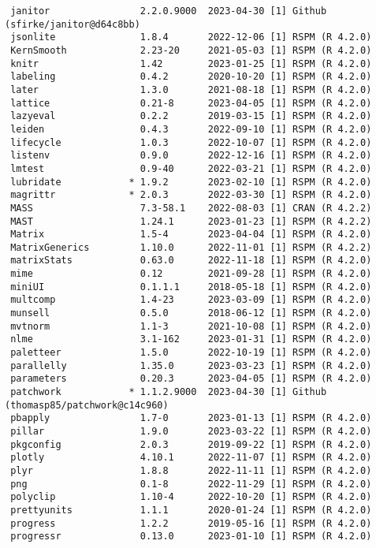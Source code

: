 \documentclass[
  letterpaper,
  DIV=11,
  numbers=noendperiod]{scrartcl}
\begin{document}
\begin{verbatim}
 janitor                2.2.0.9000  2023-04-30 [1] Github (sfirke/janitor@d64c8bb)
 jsonlite               1.8.4       2022-12-06 [1] RSPM (R 4.2.0)
 KernSmooth             2.23-20     2021-05-03 [1] RSPM (R 4.2.0)
 knitr                  1.42        2023-01-25 [1] RSPM (R 4.2.0)
 labeling               0.4.2       2020-10-20 [1] RSPM (R 4.2.0)
 later                  1.3.0       2021-08-18 [1] RSPM (R 4.2.0)
 lattice                0.21-8      2023-04-05 [1] RSPM (R 4.2.0)
 lazyeval               0.2.2       2019-03-15 [1] RSPM (R 4.2.0)
 leiden                 0.4.3       2022-09-10 [1] RSPM (R 4.2.0)
 lifecycle              1.0.3       2022-10-07 [1] RSPM (R 4.2.0)
 listenv                0.9.0       2022-12-16 [1] RSPM (R 4.2.0)
 lmtest                 0.9-40      2022-03-21 [1] RSPM (R 4.2.0)
 lubridate            * 1.9.2       2023-02-10 [1] RSPM (R 4.2.0)
 magrittr             * 2.0.3       2022-03-30 [1] RSPM (R 4.2.0)
 MASS                   7.3-58.1    2022-08-03 [1] CRAN (R 4.2.2)
 MAST                   1.24.1      2023-01-23 [1] RSPM (R 4.2.2)
 Matrix                 1.5-4       2023-04-04 [1] RSPM (R 4.2.0)
 MatrixGenerics         1.10.0      2022-11-01 [1] RSPM (R 4.2.2)
 matrixStats            0.63.0      2022-11-18 [1] RSPM (R 4.2.0)
 mime                   0.12        2021-09-28 [1] RSPM (R 4.2.0)
 miniUI                 0.1.1.1     2018-05-18 [1] RSPM (R 4.2.0)
 multcomp               1.4-23      2023-03-09 [1] RSPM (R 4.2.0)
 munsell                0.5.0       2018-06-12 [1] RSPM (R 4.2.0)
 mvtnorm                1.1-3       2021-10-08 [1] RSPM (R 4.2.0)
 nlme                   3.1-162     2023-01-31 [1] RSPM (R 4.2.0)
 paletteer              1.5.0       2022-10-19 [1] RSPM (R 4.2.0)
 parallelly             1.35.0      2023-03-23 [1] RSPM (R 4.2.0)
 parameters             0.20.3      2023-04-05 [1] RSPM (R 4.2.0)
 patchwork            * 1.1.2.9000  2023-04-30 [1] Github (thomasp85/patchwork@c14c960)
 pbapply                1.7-0       2023-01-13 [1] RSPM (R 4.2.0)
 pillar                 1.9.0       2023-03-22 [1] RSPM (R 4.2.0)
 pkgconfig              2.0.3       2019-09-22 [1] RSPM (R 4.2.0)
 plotly                 4.10.1      2022-11-07 [1] RSPM (R 4.2.0)
 plyr                   1.8.8       2022-11-11 [1] RSPM (R 4.2.0)
 png                    0.1-8       2022-11-29 [1] RSPM (R 4.2.0)
 polyclip               1.10-4      2022-10-20 [1] RSPM (R 4.2.0)
 prettyunits            1.1.1       2020-01-24 [1] RSPM (R 4.2.0)
 progress               1.2.2       2019-05-16 [1] RSPM (R 4.2.0)
 progressr              0.13.0      2023-01-10 [1] RSPM (R 4.2.0)

\end{verbatim}
\end{document}

